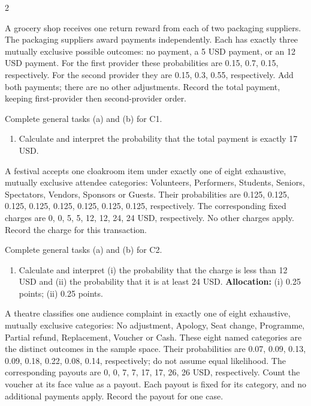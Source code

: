 \begin{multicols*}{2}
\noindent\begin{minipage}{\linewidth}
A grocery shop receives one return reward from each of two packaging suppliers. The packaging suppliers award payments independently. Each has exactly three mutually exclusive possible outcomes: no payment, a 5 USD payment, or an 12 USD payment. For the first provider these probabilities are 0.15, 0.7, 0.15, respectively. For the second provider they are 0.15, 0.3, 0.55, respectively. Add both payments; there are no other adjustments. Record the total payment, keeping first-provider then second-provider order.

Complete general tasks (a)  and (b)  for C1.
\begin{enumerate}[label=(\alph*),start=3]
\item {} Calculate and interpret the probability that the total payment is exactly 17 USD.
\end{enumerate}
\end{minipage}\par\medskip

\noindent\begin{minipage}{\linewidth}
A festival accepts one cloakroom item under exactly one of eight exhaustive, mutually exclusive attendee categories: Volunteers, Performers, Students, Seniors, Spectators, Vendors, Sponsors or Guests. Their probabilities are 0.125, 0.125, 0.125, 0.125, 0.125, 0.125, 0.125, 0.125, respectively. The corresponding fixed charges are 0, 0, 5, 5, 12, 12, 24, 24 USD, respectively. No other charges apply. Record the charge for this transaction.

Complete general tasks (a)  and (b)  for C2.
\begin{enumerate}[label=(\alph*),start=3]
\item {} Calculate and interpret (i) the probability that the charge is less than 12 USD and (ii) the probability that it is at least 24 USD.
\textbf{Allocation:} (i) 0.25 points; (ii) 0.25 points.
\end{enumerate}
\end{minipage}\par\medskip

\noindent\begin{minipage}{\linewidth}
A theatre classifies one audience complaint in exactly one of eight exhaustive, mutually exclusive categories: No adjustment, Apology, Seat change, Programme, Partial refund, Replacement, Voucher or Cash. These eight named categories are the distinct outcomes in the sample space. Their probabilities are 0.07, 0.09, 0.13, 0.09, 0.18, 0.22, 0.08, 0.14, respectively; do not assume equal likelihood. The corresponding payouts are 0, 0, 7, 7, 17, 17, 26, 26 USD, respectively. Count the voucher at its face value as a payout. Each payout is fixed for its category, and no additional payments apply. Record the payout for one case.


\end{minipage}
\end{multicols*}
